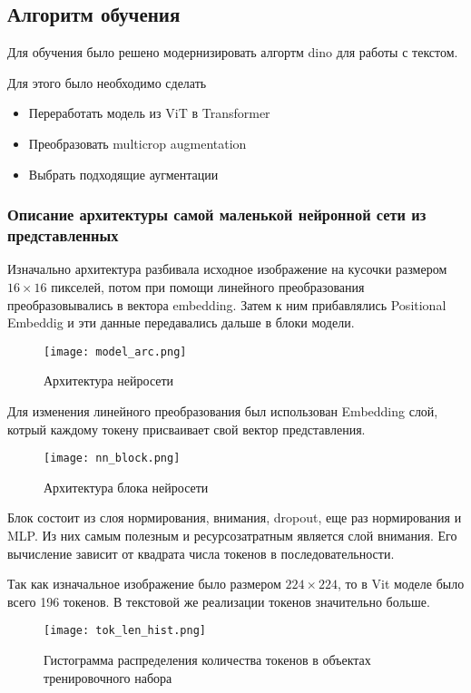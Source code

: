 \documentclass[../part_2.tex]{subfiles}
\begin{document}
    \subsection{Алгоритм обучения}
    \par Для обучения было решено модернизировать алгортм dino для работы с текстом.
    \par Для этого было необходимо сделать
    \begin{itemize}
        \item Переработать модель из ViT в Transformer
        \item Преобразовать multicrop augmentation
        \item Выбрать подходящие аугментации
    \end{itemize}
    \subsubsection{Описание архитектуры самой маленькой нейронной сети из представленных}    
    \par Изначально архитектура разбивала исходное изображение на кусочки размером $16\times16$ пикселей, потом при помощи линейного преобразования преобразовывались в вектора embedding. Затем к ним прибавлялись Positional Embeddig и эти данные передавались дальше в блоки модели.
    \begin{figure}[H]
        \centering
        \texttt{[image: model\_arc.png]}
        \caption{Архитектура нейросети}
        \label{fig:model_arc}
    \end{figure}
    \par Для изменения линейного преобразования был использован Embedding слой, котрый каждому токену присваивает свой вектор представления.
    \begin{figure}[H]
        \centering
        \texttt{[image: nn\_block.png]}
        \caption{Архитектура блока нейросети}
        \label{fig:nn_block}
    \end{figure}
    \par Блок состоит из слоя нормирования, внимания, dropout, еще раз нормирования и MLP. Из них самым полезным и ресурсозатратным является слой внимания. Его вычисление зависит от квадрата числа токенов в последовательности.
    \par Так как изначальное изображение было размером $224\times224$, то в Vit моделе было всего 196 токенов. В текстовой же реализации токенов значительно больше.
    \begin{figure}[H]
        \centering
        \texttt{[image: tok\_len\_hist.png]}
        \caption{Гистограмма распределения количества токенов в объектах тренировочного набора}
        \label{fig:tok_len_hist}
    \end{figure}
\end{document}
